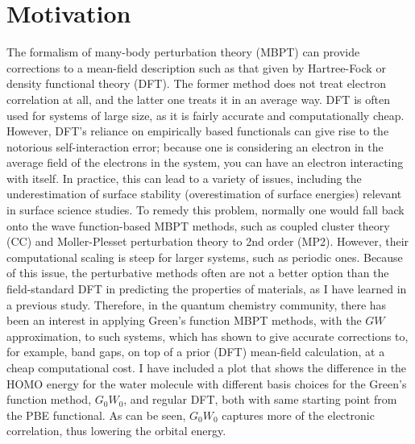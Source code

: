 \documentclass[12pt]{caltech_thesis}
\begin{document}
\chapter{Motivation}
The formalism of many-body perturbation theory (MBPT) can provide corrections to a mean-field description such as that given by Hartree-Fock or density functional theory (DFT). The former method does not treat electron correlation at all, and the latter one treats it in an average way. DFT is often used for systems of large size, as it is fairly accurate and computationally cheap. However, DFT's reliance on empirically based functionals can give rise to the notorious self-interaction error; because one is considering an electron in the average field of the electrons in the system, you can have an electron interacting with itself. In practice, this can lead to a variety of issues, including the underestimation of surface stability (overestimation of surface energies) relevant in surface science studies. \autocite{schimka_accurate_2010} To remedy this problem, normally one would fall back onto the wave function-based MBPT methods, such as coupled cluster theory (CC) and Moller-Plesset perturbation theory to 2nd order (MP2). However, their computational scaling is steep for larger systems, such as periodic ones.\autocite{mcclain_gaussian-based_2017} Because of this issue, the perturbative methods often are not a better option than the field-standard DFT in predicting the properties of materials, as I have learned in a previous study.\autocite{kozlowski_elucidating_2021} Therefore, in the quantum chemistry community, there has been an interest in applying Green's function MBPT methods, with the $GW$ approximation, to such systems, which has shown to give accurate corrections to, for example, band gaps, on top of a prior (DFT) mean-field calculation, at a cheap computational cost.\autocite{noauthor_frontiers_nodate}
\newpage
 I have included a plot that shows the difference in the HOMO energy for the water molecule with different basis choices for the Green's function method, $G_0W_0$, and regular DFT, both with same starting point from the PBE functional. As can be seen, $G_0W_0$ captures more of the electronic correlation, thus lowering the orbital energy.
\end{document}

